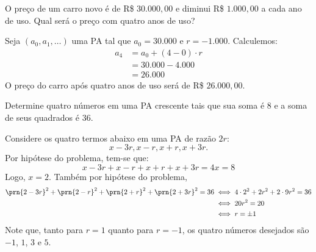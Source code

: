 \begin{onlineact}
\end{onlineact}

\begin{onlineact}
\end{onlineact}

\begin{example} 
O preço de um carro novo é de R\$ $30.000{,}00$ e diminui R\$ $1.000{,}00$ a cada ano de uso. Qual será o preço com quatro anos de uso?
\end{example}

\begin{solution}
Seja $(a_0, a_1, \dots)$ uma PA tal que $a_0 = 30.000$ e $r = -1.000$. Calculemos:
%
\begin{align*}
a_4 &= a_0+(4-0)\cdot r\\ &=30.000-4.000 \\ &= 26.000
\end{align*}
%
O preço do carro após quatro anos de uso será de R\$ $26.000{,}00$.
\end{solution}

\begin{example}
Determine quatro números em uma PA crescente tais que sua soma é 8 e a soma de seus quadrados é 36.
\end{example}

\begin{solution}
Considere os quatro termos abaixo em uma PA de razão $2r$:
%
\begin{equation*}
x-3r, x-r, x+r, x+3r.
\end{equation*}
%
Por hipótese do problema, tem-se que:
%
\begin{equation*}
x-3r+x-r+x+r+x+3r = 4x = 8 
\end{equation*}
%
Logo, $x=2$. Também por hipótese do problema, 
%
\begin{align*}
\prn{2-3r}^2 + \prn{2-r}^2 + \prn{2+r}^2 + \prn{2+3r}^2 = 36 & \iff 4 \cdot 2^2 + 2r^2 + 2\cdot 9r^2 =  36 \\ & \iff 20r^2 = 20 \\ & \iff r = \pm 1
\end{align*}
%
Note que, tanto para $r=1$ quanto para $r=-1$, os quatro números desejados são $-1$, $1$, $3$ e $5$.
\end{solution}

